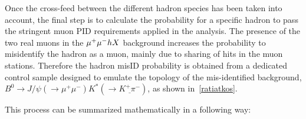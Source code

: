 Once the cross-feed between the different hadron species has been taken into account, the final step is to calculate the probability for
a specific hadron to pass the stringent muon \gls{PID} requirements applied in the analysis. The presence of the two real muons in the ${\mu^+\mu^-} h X$
background increases the probability to misidentify the hadron as a muon, mainly due to sharing of hits in the muon stations. Therefore the hadron misID probability is obtained from a dedicated control sample designed to emulate the topology of the mis-identified background,
 $B^{0} \rightarrow J/\psi(\rightarrow \mu^{+} \mu^{-}) K^{*}(\rightarrow \underline{K^{+} \pi^{-}})$, as shown in~\autoref{ratiatkos}.


This process can be summarized mathematically in a following way:

